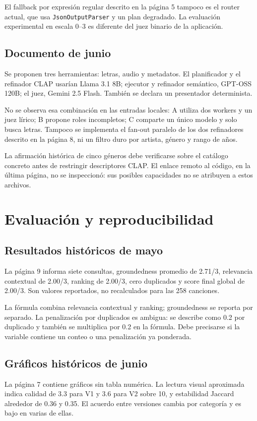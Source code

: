\documentclass[11pt,a4paper]{article}
\newcommand{\code}[1]{\nolinkurl{#1}}
\begin{document}
El fallback por expresión regular descrito en la página 5 tampoco es el router actual, que usa \code{JsonOutputParser} y un plan degradado. La evaluación experimental en escala 0--3 es diferente del juez binario de la aplicación.

\subsection{Documento de junio}
Se proponen tres herramientas: letras, audio y metadatos. El planificador y el refinador CLAP usarían Llama 3.1 8B; ejecutor y refinador semántico, GPT-OSS 120B; el juez, Gemini 2.5 Flash. También se declara un presentador determinista.

No se observa esa combinación en las entradas locales: A utiliza dos workers y un juez lírico; B propone roles incompletos; C comparte un único modelo y solo busca letras. Tampoco se implementa el fan-out paralelo de los dos refinadores descrito en la página 8, ni un filtro duro por artista, género y rango de años.

La afirmación histórica de cinco géneros debe verificarse sobre el catálogo concreto antes de restringir descriptores CLAP. El enlace remoto al código, en la última página, no se inspeccionó: sus posibles capacidades no se atribuyen a estos archivos.

\section{Evaluación y reproducibilidad}
\subsection{Resultados históricos de mayo}
La página 9 informa siete consultas, groundedness promedio de 2.71/3, relevancia contextual de 2.00/3, ranking de 2.00/3, cero duplicados y score final global de 2.00/3. Son valores reportados, no recalculados para las 258 canciones.

La fórmula combina relevancia contextual y ranking; groundedness se reporta por separado. La penalización por duplicados es ambigua: se describe como 0.2 por duplicado y también se multiplica por 0.2 en la fórmula. Debe precisarse si la variable contiene un conteo o una penalización ya ponderada.

\subsection{Gráficos históricos de junio}
La página 7 contiene gráficos sin tabla numérica. La lectura visual aproximada indica calidad de 3.3 para V1 y 3.6 para V2 sobre 10, y estabilidad Jaccard alrededor de 0.36 y 0.35. El acuerdo entre versiones cambia por categoría y es bajo en varias de ellas.
\end{document}
